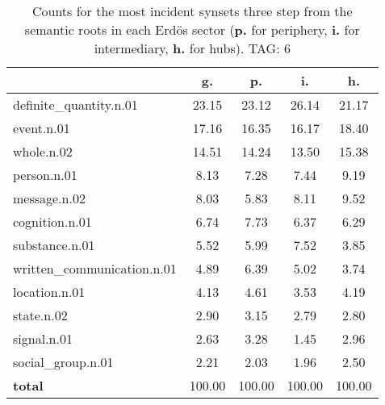 \begin{table}[h!]
\begin{center}
\begin{tabular}{| l | c | c | c | c |}\hline
 & g. & p. & i. & h. \\\hline
definite\_quantity.n.01 & 23.15  & 23.12  & 26.14  & 21.17 \\\hline
event.n.01 & 17.16  & 16.35  & 16.17  & 18.40 \\\hline
whole.n.02 & 14.51  & 14.24  & 13.50  & 15.38 \\\hline
person.n.01 & 8.13  & 7.28  & 7.44  & 9.19 \\\hline
message.n.02 & 8.03  & 5.83  & 8.11  & 9.52 \\\hline
cognition.n.01 & 6.74  & 7.73  & 6.37  & 6.29 \\\hline
substance.n.01 & 5.52  & 5.99  & 7.52  & 3.85 \\\hline
written\_communication.n.01 & 4.89  & 6.39  & 5.02  & 3.74 \\\hline
location.n.01 & 4.13  & 4.61  & 3.53  & 4.19 \\\hline
state.n.02 & 2.90  & 3.15  & 2.79  & 2.80 \\\hline
signal.n.01 & 2.63  & 3.28  & 1.45  & 2.96 \\\hline
social\_group.n.01 & 2.21  & 2.03  & 1.96  & 2.50 \\\hline
{{\bf total}} & 100.00  & 100.00  & 100.00  & 100.00 \\\hline
\end{tabular}
\caption{Counts for the most incident synsets three step from the semantic roots in each Erd\"os sector ({\bf p.} for periphery, {\bf i.} for intermediary, {\bf h.} for hubs). TAG: 6}
\end{center}
\end{table}
